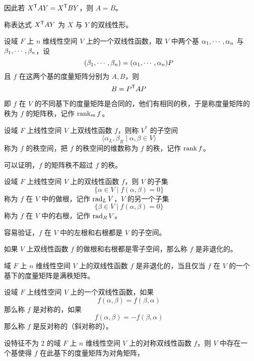 因此若 ${X}^\mathsf{T}AY = {X}^\mathsf{T}BY$，则 $A = B$。

称表达式 ${X}^\mathsf{T}AY$ 为 $X$ 与 $Y$ 的双线性形。

\begin{theorem}
    设域 $F$ 上 $n$ 维线性空间 $V$ 上的一个双线性函数，取 $V$ 中两个基 $\alpha_1,\cdots,\alpha_n$ 与 $\beta_1,\cdots,\beta_n$，设
    \[ (\beta_1,\cdots,\beta_n) = (\alpha_1,\cdots,\alpha_n)P \]
    且 $f$ 在这两个基的度量矩阵分别为 $A,B$，则
    \[ B = {P}^\mathsf{T}AP \]
\end{theorem}

即 $f$ 在 $V$ 的不同基下的度量矩阵是合同的，他们有相同的秩，于是称度量矩阵的秩为 $f$ 的矩阵秩，记作 $\operatorname{rank}_m f$。

设域 $F$ 上线性空间 $V$ 上双线性函数 $f$，则称 $V^*$ 的子空间
\[ \langle \alpha_L,\beta_R \mid \alpha,\beta \in V \rangle \]
称为 $f$ 的秩空间，把 $f$ 的秩空间的维数称为 $f$ 的秩，记作 $\operatorname{rank} f$。

可以证明，$f$ 的矩阵秩不超过 $f$ 的秩。

\begin{definition}
    设域 $F$ 上线性空间 $V$ 上的双线性函数 $f$，则 $V$ 的子集
    \[ \{ \alpha \in V \mid f(\alpha,\beta) = 0 \} \]
    称为 $f$ 在 $V$ 中的做根，记作 $\operatorname{rad}_{L} V$，$V$ 的另一个子集
    \[ \{ \beta \in V \mid f(\alpha,\beta) = 0 \} \]
    称为 $f$ 在 $V$ 中的右根，记作 $\operatorname{rad}_{R} V$。
\end{definition}

容易验证，$f$ 在 $V$ 中的左根和右根都是 $V$ 的子空间。

\begin{definition}
    如果 $V$ 上双线性函数 $f$ 的做根和右根都是零子空间，那么称 $f$ 是非退化的。
\end{definition}

\begin{theorem}
    域 $F$ 上 $n$ 维线性空间 $V$ 上的双线性函数 $f$ 是非退化的，当且仅当 $f$ 在 $V$ 的一个基下的度量矩阵是满秩矩阵。
\end{theorem}

\begin{definition}
    设域 $F$ 上线性空间 $V$ 上的一个双线性函数，如果
    \[ f(\alpha,\beta) = f(\beta,\alpha) \]
    那么称 $f$ 是对称的，如果
    \[ f(\alpha,\beta) = -f(\beta,\alpha) \]
    那么称 $f$ 是反对称的（斜对称的）。
\end{definition}

\begin{theorem}
    设特征不为 $2$ 的域 $F$ 上 $n$ 维线性空间 $V$ 上的对称双线性函数 $f$，则 $V$ 中存在一个基使得 $f$ 在此基下的度量矩阵为对角矩阵，
\end{theorem}

